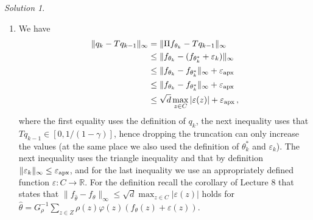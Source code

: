 \documentclass{article}
\newcommand{\norm}[1]{\| #1 \|}
\renewcommand{\epsilon}{\varepsilon}
\renewcommand{\phi}{\varphi}
\newcommand{\R}{\mathbb{R}}
\DeclareMathOperator*{\1}{\mathbbm{1}}
\newcommand{\0}{\mathbf{0}}
\theoremstyle{definition}
\theoremstyle{remark}
\newtheorem*{solution*}{Solution}
\begin{document}
\begin{solution*}
\begin{enumerate}
\item 
We have 
\begin{align*}
\norm{q_k - T q_{k-1}}_\infty 
& =
\norm{ \Pi f_{\theta_k} - T q_{k-1}}_\infty \\
& \le
\norm{ f_{\theta_k} - (f_{\theta_k^*} + \epsilon_k) }_\infty\\
&\le
\norm{ f_{\theta_k} - f_{\theta_k^*}}_\infty + \epx\\
& \le
\norm{ f_{\theta_k} - f_{\theta_k^*}}_\infty + \epx\\
& \leq 
\sqrt{d} \max_{z\in C} |\epsilon(z)| + \epx\,,
\end{align*}
where the first equality uses the definition of $q_k$,
the next inequality uses that $T q_{k-1}\in [0,1/(1-\gamma)]$, hence dropping the truncation can only increase the values (at the same place we also used the
definition of $\theta_k^*$ and $\epsilon_k$).
The next inequality uses the triangle inequality and that by definition $\norm{\epsilon_k}_\infty \le \epx$,
and for 
%
the last inequality we use an appropriately defined function $\epsilon: C \to \R$.
For the definition recall the corollary of Lecture 8 that states that $\norm{f_{\hat\theta}-f_\theta}_\infty \le \sqrt{d} \max_{z\in C} |\epsilon(z)|$ holds for $\hat\theta = G_\rho^{-1} \sum_{z\in Z} \rho(z) \phi(z) (f_\theta(z) + \epsilon(z))$.

\end{enumerate}
\end{solution*}
\end{document}
